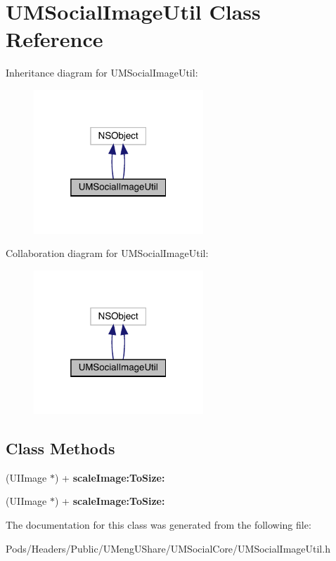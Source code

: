 \hypertarget{interface_u_m_social_image_util}{}\section{U\+M\+Social\+Image\+Util Class Reference}
\label{interface_u_m_social_image_util}


Inheritance diagram for U\+M\+Social\+Image\+Util\+:\nopagebreak
\begin{figure}[H]
\begin{center}
\leavevmode
\includegraphics[width=181pt]{interface_u_m_social_image_util__inherit__graph}
\end{center}
\end{figure}


Collaboration diagram for U\+M\+Social\+Image\+Util\+:\nopagebreak
\begin{figure}[H]
\begin{center}
\leavevmode
\includegraphics[width=181pt]{interface_u_m_social_image_util__coll__graph}
\end{center}
\end{figure}
\subsection*{Class Methods}
\begin{DoxyCompactItemize}
\item 
\mbox{\label{interface_u_m_social_image_util_aaa8cf7684d15d89c6d8d1dc8c5c3b891}} 
(U\+I\+Image $\ast$) + {\bfseries scale\+Image\+:\+To\+Size\+:}
\item 
\mbox{\label{interface_u_m_social_image_util_aaa8cf7684d15d89c6d8d1dc8c5c3b891}} 
(U\+I\+Image $\ast$) + {\bfseries scale\+Image\+:\+To\+Size\+:}
\end{DoxyCompactItemize}


The documentation for this class was generated from the following file\+:\begin{DoxyCompactItemize}
\item 
Pods/\+Headers/\+Public/\+U\+Meng\+U\+Share/\+U\+M\+Social\+Core/U\+M\+Social\+Image\+Util.\+h\end{DoxyCompactItemize}
